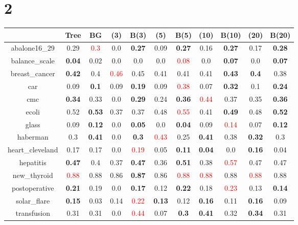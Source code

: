 \documentclass{article}%
\begin{document}
\section*{2}%
\begin{tabular}{c|cccccccccc}%
\hline%
&Tree&BG&(3)&B(3)&(5)&B(5)&(10)&B(10)&(20)&B(20)\\%
\hline%
abalone16\_29&0.29&\textcolor{red}{ 
0.3
}&0.0&\textbf{0.27}&0.09&\textbf{0.27}&0.16&\textbf{0.27}&0.17&\textbf{0.28}\\%
\hline%
balance\_scale&\textbf{0.04}&0.02&0.0&0.0&0.0&\textcolor{red}{ 
0.08
}&0.0&\textbf{0.07}&0.0&\textbf{0.07}\\%
\hline%
breast\_cancer&\textbf{0.42}&0.4&\textcolor{red}{ 
0.46
}&0.45&0.41&0.41&0.41&\textbf{0.43}&\textbf{0.4}&0.38\\%
\hline%
car&0.09&\textbf{0.1}&0.09&\textbf{0.19}&0.09&\textcolor{red}{ 
0.38
}&0.07&\textbf{0.32}&0.1&\textbf{0.24}\\%
\hline%
cmc&\textbf{0.34}&0.33&0.0&\textbf{0.29}&0.24&\textbf{0.36}&\textcolor{red}{ 
0.44
}&0.37&0.35&\textbf{0.36}\\%
\hline%
ecoli&0.52&\textbf{0.53}&0.37&0.37&0.48&\textcolor{red}{ 
0.55
}&0.41&\textbf{0.49}&0.48&\textbf{0.52}\\%
\hline%
glass&0.09&\textbf{0.12}&0.0&\textbf{0.05}&0.0&\textbf{0.04}&0.09&\textcolor{red}{ 
0.14
}&0.07&\textbf{0.12}\\%
\hline%
haberman&0.3&\textbf{0.41}&0.0&\textbf{0.3}&\textcolor{red}{ 
0.43
}&0.25&\textbf{0.41}&0.38&\textbf{0.32}&0.3\\%
\hline%
heart\_cleveland&0.17&0.17&0.0&\textcolor{red}{ 
0.19
}&0.05&\textbf{0.11}&\textbf{0.04}&0.0&\textbf{0.16}&0.04\\%
\hline%
hepatitis&\textbf{0.47}&0.4&0.37&\textbf{0.47}&0.36&\textbf{0.51}&0.38&\textcolor{red}{ 
0.57
}&0.47&0.47\\%
\hline%
new\_thyroid&\textcolor{red}{ 
0.88
}&0.88&0.86&\textbf{0.87}&0.86&\textcolor{red}{ 
0.88
}&\textcolor{red}{ 
0.88
}&0.88&\textcolor{red}{ 
0.88
}&0.88\\%
\hline%
postoperative&\textbf{0.21}&0.19&0.0&\textbf{0.17}&0.12&\textbf{0.22}&0.18&\textcolor{red}{ 
0.23
}&0.13&\textbf{0.14}\\%
\hline%
solar\_flare&\textbf{0.15}&0.03&0.14&\textcolor{red}{ 
0.22
}&\textbf{0.13}&0.12&\textbf{0.16}&0.11&\textbf{0.16}&0.09\\%
\hline%
transfusion&0.31&0.31&0.0&\textcolor{red}{ 
0.44
}&0.07&\textbf{0.3}&\textbf{0.41}&0.32&\textbf{0.34}&0.31\\%

\end{tabular}
\end{document}
